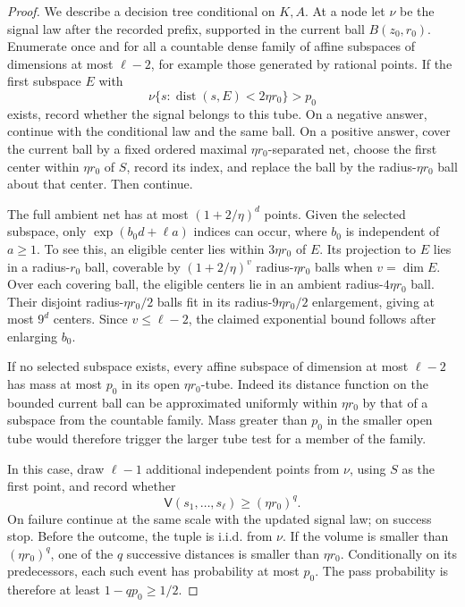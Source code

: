 \begin{proof}
We describe a decision tree conditional on \(K,A\).  At a node let
\(\nu\) be the signal law after the recorded prefix, supported in
the current ball \(B(z_0,r_0)\).  Enumerate once and for all a
countable dense family of affine subspaces of dimensions at most
\(\ell-2\), for example those generated by rational points.
If the first subspace \(E\) with
\[
 \nu\{s:\operatorname{dist}(s,E)<2\eta r_0\}>p_0
\]
exists, record whether the signal belongs to this tube.  On a negative
answer, continue with the conditional law and the same ball.  On a
positive answer, cover the current ball by a fixed ordered maximal
\(\eta r_0\)-separated net, choose the first center within
\(\eta r_0\) of \(S\), record its index, and replace the ball by the
radius-\(\eta r_0\) ball about that center.  Then continue.

The full ambient net has at most \((1+2/\eta)^d\) points.  Given
the selected subspace, only \(\exp(b_0d+\ell a)\) indices can occur,
where \(b_0\) is independent of \(a\ge1\).  To see this, an eligible
center lies within \(3\eta r_0\) of \(E\).  Its projection to \(E\)
lies in a radius-\(r_0\) ball, coverable by
\((1+2/\eta)^v\) radius-\(\eta r_0\) balls when \(v=\dim E\).
Over each covering ball, the eligible centers lie in an ambient
radius-\(4\eta r_0\) ball.  Their disjoint radius-\(\eta r_0/2\)
balls fit in its radius-\(9\eta r_0/2\) enlargement, giving at most
\(9^d\) centers.  Since \(v\le\ell-2\), the claimed exponential
bound follows after enlarging \(b_0\).

If no selected subspace exists, every affine subspace of dimension
at most \(\ell-2\) has mass at most \(p_0\) in its open
\(\eta r_0\)-tube.  Indeed its distance function on the bounded
current ball can be approximated uniformly within \(\eta r_0\)
by that of a subspace from the countable family.  Mass greater than
\(p_0\) in the smaller open tube would therefore trigger the larger
tube test for a member of the family.

In this case, draw \(\ell-1\) additional independent points from
\(\nu\), using \(S\) as the first point, and record whether
\[
 \mathsf V(s_1,\ldots,s_\ell)\ge(\eta r_0)^q.
\]
On failure continue at the same scale with the updated signal law;
on success stop.  Before the outcome, the tuple is i.i.d. from
\(\nu\).  If the volume is smaller than \((\eta r_0)^q\), one of
the \(q\) successive distances is smaller than \(\eta r_0\).
Conditionally on its predecessors, each such event has probability
at most \(p_0\).  The pass probability is therefore at least
\(1-qp_0\ge1/2\).


\end{proof}
